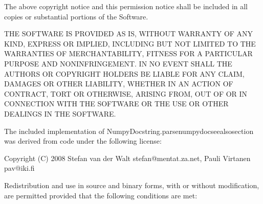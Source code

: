 \documentclass[letterpaper,10pt,english]{sphinxmanual}
\begin{document}
\begin{sphinxVerbatim}[commandchars=\\\{\}]
The above copyright notice and this permission notice shall be
included in all copies or substantial portions of the Software.

THE SOFTWARE IS PROVIDED \PYGZdq{}AS IS\PYGZdq{}, WITHOUT WARRANTY OF ANY KIND,
EXPRESS OR IMPLIED, INCLUDING BUT NOT LIMITED TO THE WARRANTIES
OF MERCHANTABILITY, FITNESS FOR A PARTICULAR PURPOSE AND
NONINFRINGEMENT. IN NO EVENT SHALL THE AUTHORS OR COPYRIGHT
HOLDERS BE LIABLE FOR ANY CLAIM, DAMAGES OR OTHER LIABILITY,
WHETHER IN AN ACTION OF CONTRACT, TORT OR OTHERWISE, ARISING
FROM, OUT OF OR IN CONNECTION WITH THE SOFTWARE OR THE USE OR
OTHER DEALINGS IN THE SOFTWARE.

\PYGZhy{}\PYGZhy{}\PYGZhy{}\PYGZhy{}\PYGZhy{}\PYGZhy{}\PYGZhy{}\PYGZhy{}\PYGZhy{}\PYGZhy{}\PYGZhy{}\PYGZhy{}\PYGZhy{}\PYGZhy{}\PYGZhy{}\PYGZhy{}\PYGZhy{}\PYGZhy{}\PYGZhy{}\PYGZhy{}\PYGZhy{}\PYGZhy{}\PYGZhy{}\PYGZhy{}\PYGZhy{}\PYGZhy{}\PYGZhy{}\PYGZhy{}\PYGZhy{}\PYGZhy{}\PYGZhy{}\PYGZhy{}\PYGZhy{}\PYGZhy{}\PYGZhy{}\PYGZhy{}\PYGZhy{}\PYGZhy{}\PYGZhy{}\PYGZhy{}\PYGZhy{}\PYGZhy{}\PYGZhy{}\PYGZhy{}\PYGZhy{}\PYGZhy{}\PYGZhy{}\PYGZhy{}\PYGZhy{}\PYGZhy{}\PYGZhy{}\PYGZhy{}\PYGZhy{}\PYGZhy{}\PYGZhy{}\PYGZhy{}\PYGZhy{}\PYGZhy{}\PYGZhy{}\PYGZhy{}\PYGZhy{}\PYGZhy{}\PYGZhy{}\PYGZhy{}\PYGZhy{}\PYGZhy{}\PYGZhy{}\PYGZhy{}\PYGZhy{}\PYGZhy{}\PYGZhy{}\PYGZhy{}\PYGZhy{}\PYGZhy{}\PYGZhy{}\PYGZhy{}\PYGZhy{}\PYGZhy{}\PYGZhy{}

The included implementation of NumpyDocstring.\PYGZus{}parse\PYGZus{}numpydoc\PYGZus{}see\PYGZus{}also\PYGZus{}section
was derived from code under the following license:

\PYGZhy{}\PYGZhy{}\PYGZhy{}\PYGZhy{}\PYGZhy{}\PYGZhy{}\PYGZhy{}\PYGZhy{}\PYGZhy{}\PYGZhy{}\PYGZhy{}\PYGZhy{}\PYGZhy{}\PYGZhy{}\PYGZhy{}\PYGZhy{}\PYGZhy{}\PYGZhy{}\PYGZhy{}\PYGZhy{}\PYGZhy{}\PYGZhy{}\PYGZhy{}\PYGZhy{}\PYGZhy{}\PYGZhy{}\PYGZhy{}\PYGZhy{}\PYGZhy{}\PYGZhy{}\PYGZhy{}\PYGZhy{}\PYGZhy{}\PYGZhy{}\PYGZhy{}\PYGZhy{}\PYGZhy{}\PYGZhy{}\PYGZhy{}\PYGZhy{}\PYGZhy{}\PYGZhy{}\PYGZhy{}\PYGZhy{}\PYGZhy{}\PYGZhy{}\PYGZhy{}\PYGZhy{}\PYGZhy{}\PYGZhy{}\PYGZhy{}\PYGZhy{}\PYGZhy{}\PYGZhy{}\PYGZhy{}\PYGZhy{}\PYGZhy{}\PYGZhy{}\PYGZhy{}\PYGZhy{}\PYGZhy{}\PYGZhy{}\PYGZhy{}\PYGZhy{}\PYGZhy{}\PYGZhy{}\PYGZhy{}\PYGZhy{}\PYGZhy{}\PYGZhy{}\PYGZhy{}\PYGZhy{}\PYGZhy{}\PYGZhy{}\PYGZhy{}\PYGZhy{}\PYGZhy{}\PYGZhy{}\PYGZhy{}

Copyright (C) 2008 Stefan van der Walt \PYGZlt{}stefan@mentat.za.net\PYGZgt{}, Pauli Virtanen \PYGZlt{}pav@iki.fi\PYGZgt{}

Redistribution and use in source and binary forms, with or without
modification, are permitted provided that the following conditions are
met:


\end{sphinxVerbatim}
\end{document}

